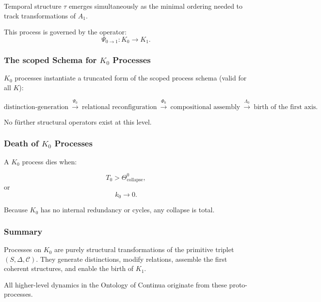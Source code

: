 Temporal structure $\tau$ emerges simultaneously as the minimal ordering
needed to track transformations of $A_1$.

This process is governed by the operator:
\[
\Psi_{0\to1}: K_0 \to K_1.
\]

\subsubsection{The scoped Schema for \texorpdfstring{$K_0$}{K_0} Processes}

$K_0$ processes instantiate a truncated form of the scoped process schema
(valid for all $K$):

\[
\text{distinction-generation}
\ \xrightarrow{\Psi_0}
\ \text{relational reconfiguration}
\ \xrightarrow{\Phi_0}
\ \text{compositional assembly}
\ \xrightarrow{\Lambda_0}
\ \text{birth of the first axis}.
\]

No fürther structural operators exist at this level.

\subsubsection{Death of \texorpdfstring{$K_0$}{K_0} Processes}

A $K_0$ process dies when:

\[
T_0 > \Theta^0_{\mathrm{collapse}},
\]
or
\[
k_0 \to 0.
\]

Because $K_0$ has no internal redundancy or cycles, any collapse is total.

\subsubsection{Summary}

Processes on $K_0$ are purely structural transformations of the primitive
triplet $(S, \Delta, \mathcal{C})$.
They generate distinctions, modify relations, assemble the first coherent
structures, and enable the birth of $K_1$.

All higher-level dynamics in the Ontology of Continua originate from these
proto-processes.
